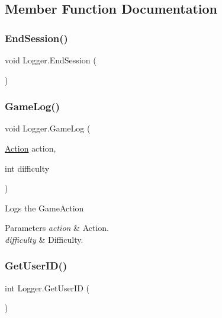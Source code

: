 \subsection{Member Function Documentation}
\mbox{\label{classLogger_a132993921b28aba513c2269245ac524e}} 
\subsubsection{\texorpdfstring{End\+Session()}{EndSession()}}
{\footnotesize\ttfamily void Logger.\+End\+Session (\begin{DoxyParamCaption}{ }\end{DoxyParamCaption})\hspace{0.3cm}{\ttfamily [inline]}}

\mbox{\label{classLogger_a98d17dc5b719d710cec46f6b05aa2de3}} 
\subsubsection{\texorpdfstring{Game\+Log()}{GameLog()}}
{\footnotesize\ttfamily void Logger.\+Game\+Log (\begin{DoxyParamCaption}\item[{\hyperlink{LogActions_8cs_a8bb1ef53467e4f61410d12822d922498}{Action}}]{action,  }\item[{int}]{difficulty }\end{DoxyParamCaption})\hspace{0.3cm}{\ttfamily [inline]}}



Logs the Game\+Action 


\begin{DoxyParams}{Parameters}
{\em action} & Action.\\
\hline
{\em difficulty} & Difficulty.\\
\hline
\end{DoxyParams}
\mbox{\label{classLogger_a40bd581a38e52d1c5a80c863799e9d48}} 
\subsubsection{\texorpdfstring{Get\+User\+I\+D()}{GetUserID()}}
{\footnotesize\ttfamily int Logger.\+Get\+User\+ID (\begin{DoxyParamCaption}{ }\end{DoxyParamCaption})\hspace{0.3cm}{\ttfamily [inline]}}

